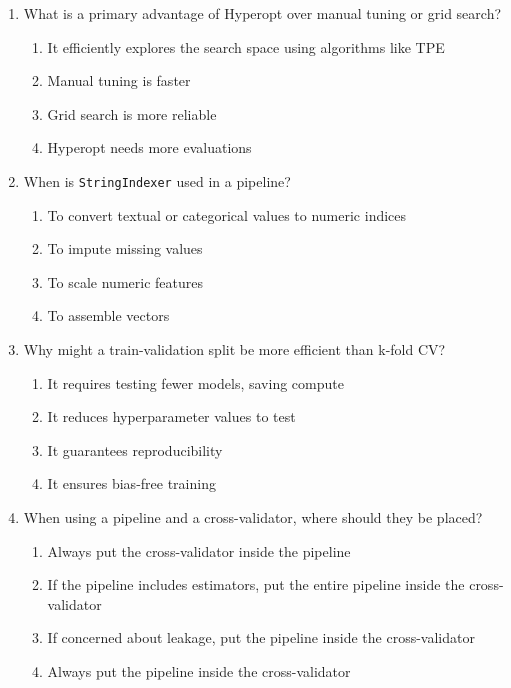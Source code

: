 \documentclass[11pt]{article}
\begin{document}
\begin{enumerate}[leftmargin=*, label=\textbf{Q\arabic*.}, start=58]
		\item What is a primary advantage of Hyperopt over manual tuning or grid search?
		\begin{enumerate}[label=(\alph*)]
			\item It efficiently explores the search space using algorithms like TPE
			\item Manual tuning is faster
			\item Grid search is more reliable
			\item Hyperopt needs more evaluations
		\end{enumerate}
		
		\item When is \texttt{StringIndexer} used in a pipeline?
		\begin{enumerate}[label=(\alph*)]
			\item To convert textual or categorical values to numeric indices
			\item To impute missing values
			\item To scale numeric features
			\item To assemble vectors
		\end{enumerate}
		
		\item Why might a train-validation split be more efficient than k-fold CV?
		\begin{enumerate}[label=(\alph*)]
			\item It requires testing fewer models, saving compute
			\item It reduces hyperparameter values to test
			\item It guarantees reproducibility
			\item It ensures bias-free training
		\end{enumerate}
		
		\item When using a pipeline and a cross-validator, where should they be placed?
		\begin{enumerate}[label=(\alph*)]
			\item Always put the cross-validator inside the pipeline
			\item If the pipeline includes estimators, put the entire pipeline inside the cross-validator
			\item If concerned about leakage, put the pipeline inside the cross-validator
			\item Always put the pipeline inside the cross-validator
		\end{enumerate}
		

\end{enumerate}
\end{document}
